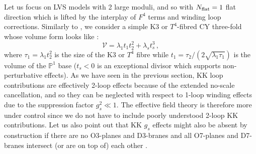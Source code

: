 \documentclass[11pt,a4paper]{article}
\newcommand{\be}{\begin{equation}}
\newcommand{\ee}{\end{equation}}
\newcommand\vo{{\mathcal{V}}}
\begin{document}
Let us focus on LVS models with 2 large moduli, and so with $N_{\rm flat}=1$ flat direction which is lifted by the interplay of $F^4$ terms and winding loop corrections. Similarly to \cite{Cicoli:2008va}, we consider a simple K3 or $T^4$-fibred CY three-fold whose volume form looks like \cite{Cicoli:2011it}:
\be
\vo = \lambda_1 t_1 t_2^2 + \lambda_s t_s^3\,,
\ee
where $\tau_1= \lambda_1 t_2^2$ is the size of the K3 or $T^4$ fibre while $t_1 = \tau_2/\left(2 \sqrt{\lambda_1 \tau_1}\right)$ is the volume of the $\mathbb{P}^1$ base ($t_s<0$ is an exceptional divisor which supports non-perturbative effects). As we have seen in the previous section, KK loop contributions are effectively 2-loop effects because of the extended no-scale cancellation, and so they can be neglected with respect to 1-loop winding effects due to the suppression factor $g_s^2\ll 1$. The effective field theory is therefore more under control since we do not have to include poorly understood 2-loop KK contributions. Let us also point out that KK $g_s$ effects might also be absent by construction if there are no O3-planes and D3-branes and all O7-planes and D7-branes intersect (or are on top of) each other \cite{Berg:2007wt}. 
\end{document}
